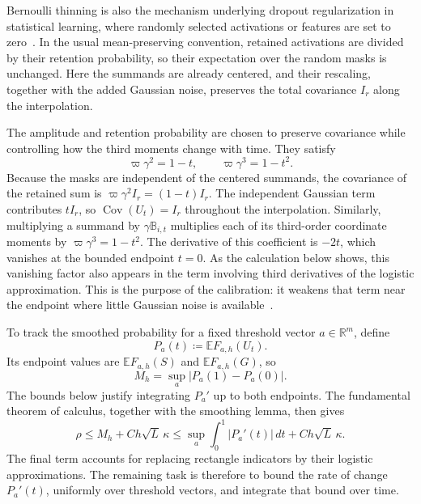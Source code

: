 \documentclass[11pt,letterpaper]{article}
\theoremstyle{remark}
\newcommand{\E}{\mathbb E}
\newcommand{\R}{\mathbb R}
\newcommand{\Cov}{\operatorname{Cov}}
\newcommand{\dd}{\,d}
\begin{document}
Bernoulli thinning is also the mechanism underlying dropout
regularization in statistical learning, where randomly selected
activations or features are set to zero~\cite{Dropout2014}. In the
usual mean-preserving convention, retained activations are divided by
their retention probability, so their expectation over the random
masks is unchanged. Here the summands are already centered, and their
rescaling, together with the added Gaussian noise, preserves the total
covariance \(I_r\) along the interpolation.

The amplitude and retention probability are chosen to preserve covariance
while controlling how the third moments change with time. They satisfy
\[
 \varpi\gamma^2=1-t,\qquad
 \varpi\gamma^3=1-t^2.
\]
Because the masks are independent of the centered summands, the covariance
of the retained sum is \(\varpi\gamma^2I_r=(1-t)I_r\). The independent
Gaussian term contributes \(tI_r\), so \(\Cov(U_t)=I_r\) throughout
the interpolation. Similarly, multiplying a summand by
\(\gamma\mathbb B_{i,t}\) multiplies each of its third-order coordinate
moments by \(\varpi\gamma^3=1-t^2\). The derivative of this coefficient
is \(-2t\), which vanishes at the bounded endpoint \(t=0\). As the
calculation below shows, this vanishing factor also appears in the term
involving third derivatives of the logistic approximation. This is the
purpose of the calibration: it weakens that term near the endpoint where
little Gaussian noise is available~\cite[eq.~(17)]{AL}.

To track the smoothed probability for a fixed threshold vector
\(a\in\R^m\), define
\[
 P_a(t)\coloneqq\E F_{a,h}(U_t).
\]
Its endpoint values are \(\E F_{a,h}(S)\) and \(\E F_{a,h}(G)\), so
\[
 M_h=\sup_a|P_a(1)-P_a(0)|.
\]
The bounds below justify integrating \(P_a'\) up to both endpoints.
The fundamental theorem of calculus, together with the smoothing lemma,
then gives
\begin{equation}
 \rho\le M_h+Ch\sqrt L\,\kappa
 \le\sup_a\int_0^1|P_a'(t)|\dd t+Ch\sqrt L\,\kappa.
 \label{eq:roadmap}
\end{equation}
The final term accounts for replacing rectangle indicators by their
logistic approximations. The remaining task is therefore to bound the
rate of change \(P_a'(t)\), uniformly over threshold vectors, and integrate
that bound over time.
\end{document}

